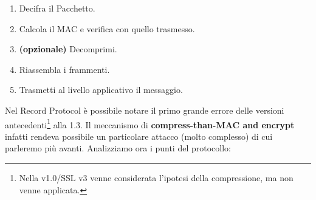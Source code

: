 \begin{theorem}\label{thm:recordprotocolrcv}
\begin{enumerate}
    \item Decifra il Pacchetto.
    \item Calcola il MAC e verifica con quello trasmesso.
    \item \textbf{(opzionale)} Decomprimi.
    \item Riassembla i frammenti.
    \item Trasmetti al livello applicativo il messaggio.
\end{enumerate}
\end{theorem}\pagebreak
Nel Record Protocol è possibile notare il primo grande errore delle versioni antecedenti\footnote{Nella v1.0/SSL v3 venne considerata l'ipotesi della compressione, ma non venne applicata.} alla 1.3. Il meccanismo di \textbf{compress-than-MAC and encrypt} infatti rendeva possibile un particolare attacco (molto complesso) di cui parleremo più avanti. Analizziamo ora i punti del protocollo:


